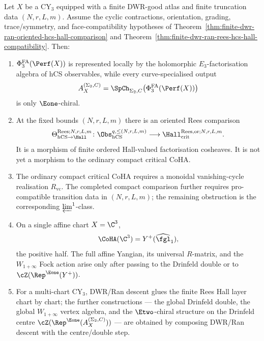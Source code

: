 \begin{proposition}
\label{prop:qca-finite-rees-layer-separation}
Let \(X\) be a CY$_3$ equipped with a finite DWR-good atlas and finite
truncation data \((N,r,L,m)\).  Assume the cyclic contractions,
orientation, grading, trace/symmetry, and face-compatibility hypotheses
of Theorem~\ref{thm:finite-dwr-ran-oriented-hcs-hall-comparison} and
Theorem~\ref{thm:finite-dwr-ran-rees-hcs-hall-compatibility}.  Then:
\begin{enumerate}[label=\textup{(\roman*)}]
\item \(\PhiFA_3(\Perf(X))\) is represented locally by the holomorphic
\(E_3\)-factorisation algebra of hCS observables, while every
curve-specialised output
\[
 A_X^{(\Sigma_2,C)}
   =\SpCh_{\Sigma_2,C}\bigl(\PhiFA_3(\Perf(X))\bigr)
\]
is only \(\Eone\)-chiral.
\item At the fixed bounds \((N,r,L,m)\) there is an oriented Rees
comparison
\[
 \Theta_{\hCS\to\Hall}^{\mathrm{Rees};N,r,L,m}\colon
 \Obs_{\hCS}^{q,\leq(N,r,L,m)}
 \longrightarrow
 \Hall_{\mathrm{crit}}^{\mathrm{Rees,or};N,r,L,m}.
\]
It is a morphism of finite ordered Hall-valued factorisation cosheaves.
It is not yet a morphism to the ordinary compact critical CoHA.
\item The ordinary compact critical CoHA requires a monoidal
vanishing-cycle realisation \(R_{\mathrm{vc}}\).  The completed compact
comparison further requires pro-compatible transition data in
\((N,r,L,m)\); the remaining obstruction is the corresponding
\(\varprojlim^1\)-class.
\item On a single affine chart \(X=\C^3\),
\[
 \CoHA(\C^3)=Y^+(\widehat{\fgl}_1),
\]
the positive half.  The full affine Yangian, its universal \(R\)-matrix,
and the \(W_{1+\infty}\) Fock action arise only after passing to the
Drinfeld double or to \(\cZ(\Rep^{\Eone}(Y^+))\).
\item For a multi-chart CY$_3$, DWR/Ran descent glues the finite Rees
Hall layer chart by chart; the further constructions — the global
Drinfeld double, the global \(W_{1+\infty}\) vertex algebra, and the
\(\Etwo\)-chiral structure on the Drinfeld centre
\(\cZ(\Rep^{\Eone}(A_X^{(\Sigma_2,C)}))\) — are obtained by composing
DWR/Ran descent with the centre/double step.
\end{enumerate}
\end{proposition}


